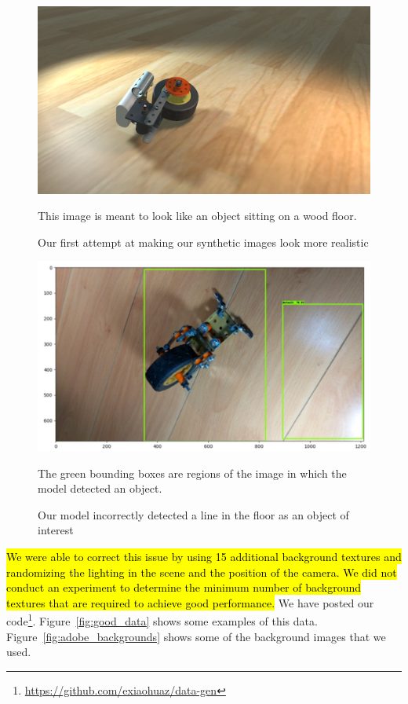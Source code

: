 \begin{figure}
  \includegraphics[width=\columnwidth]{figures/synthetic/wood_floor.png}
  \begin{captiontext}
    This image is meant to look like an object sitting on a wood floor.
  \end{captiontext}
  \caption{
    Our first attempt at making our synthetic images look more realistic
  }\label{fig:wood_floor}
\end{figure}

\begin{figure}
  \includegraphics[width=\columnwidth]{figures/synthetic/false_positive.png}
  \begin{captiontext}
    The green bounding boxes are regions of the image in which the model
    detected an object.
  \end{captiontext}
  \caption{
    Our model incorrectly detected a line in the floor as an object of interest
  }\label{fig:false_positive}
\end{figure}

\hl{
We were able to correct this issue by using 15 additional background textures
and
randomizing the lighting in the scene and the position of the camera.
We did not conduct an experiment to determine the minimum number of background
textures that are required to achieve good performance.
}
We have posted our code\footnote{\url{https://github.com/exiaohuaz/data-gen}}.
Figure~\ref{fig:good_data} shows some examples of this data.
Figure~\ref{fig:adobe_backgrounds} shows some of the background images that we
used.

